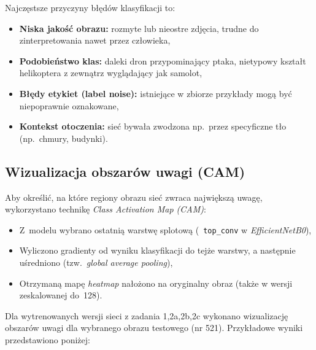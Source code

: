 Najczęstsze przyczyny błędów klasyfikacji to:
\begin{itemize}
    \item \textbf{Niska jakość obrazu:} rozmyte lub nieostre zdjęcia, trudne do zinterpretowania nawet przez człowieka,
    \item \textbf{Podobieństwo klas:} daleki dron przypominający ptaka, nietypowy kształt helikoptera z zewnątrz wyglądający jak samolot,
    \item \textbf{Błędy etykiet (label noise):} istniejące w zbiorze przykłady mogą być niepoprawnie oznakowane,
    \item \textbf{Kontekst otoczenia:} sieć bywała zwodzona np.\ przez specyficzne tło (np.\ chmury, budynki).
\end{itemize}


\subsection{Wizualizacja obszarów uwagi (CAM)}
Aby określić, na które regiony obrazu sieć zwraca największą uwagę, wykorzystano technikę \emph{Class Activation Map (CAM)}:
\begin{itemize}
    \item Z~modelu wybrano ostatnią warstwę splotową (\ \texttt{top\_conv} w \emph{EfficientNetB0}),
    \item Wyliczono gradienty od wyniku klasyfikacji do tejże warstwy, a następnie uśredniono (tzw.\ \emph{global average pooling}),
    \item Otrzymaną mapę \emph{heatmap} nałożono na oryginalny obraz (także w wersji zeskalowanej do~128).
\end{itemize}

Dla wytrenowanych wersji sieci z zadania 1,2a,2b,2c wykonano wizualizację obszarów uwagi dla wybranego obrazu testowego (nr 521). Przykładowe wyniki przedstawiono poniżej:

